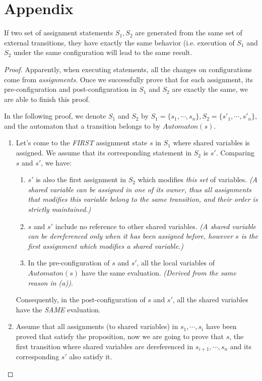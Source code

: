 \section*{Appendix}

\setcounter{theorem}{0}
\begin{theorem} If two set of assignment statements $S_1, S_2$ are generated from the same set of external transitions, they have exactly the same behavior (i.e. execution of $S_1$ and $S_2$ under the same configuration will lead to the same result.
\end{theorem}
\begin{proof}
    Apparently, when executing statements, all the changes on configurations come from \emph{assignments}. Once we successfully prove that for each assignment, its pre-configuration and post-configuration in $S_1$ and $S_2$ are exactly the same, we are able to finish this proof.
    
    In the following proof, we denote $S_1$ and $S_2$ by $S_1=\{s_1,\cdots,s_n\},S_2=\{s'_1,\cdots,s'_n\}$, and the automaton that a transition belongs to by $Automaton(s)$.
    \begin{enumerate}
        \item Let's come to the \emph{FIRST} assignment state $s$ in $S_1$ where shared variables is assigned. We assume that its corresponding statement in $S_2$ is $s'$. Comparing $s$ and $s'$, we have:
        \begin{enumerate}
            \item $s'$ is also the first assignment in $S_2$ which modifies \emph{this set} of variables.
            \emph{(A shared variable can be assigned in one of its owner, thus all assignments that modifies this variable belong to the same transition, and their order is strictly maintained.)}
            \item $s$ and $s'$ include no reference to other shared variables. \emph{(A shared variable can be dereferenced only when it has been assigned before, however $s$ is the first assignment which modifies a shared variable.)}
            \item In the pre-configuration of $s$ and $s'$, all the local variables of $Automaton(s)$ have the same evaluation. \emph{(Derived from the same reason in (a))}.
        \end{enumerate}
        Consequently, in the post-configuration of $s$ and $s'$, all the shared variables have the \emph{SAME} evaluation.

        \item Assume that all assignments (to shared variables) in $s_1,\cdots,s_i$ have been proved that satisfy the proposition, now we are going to prove that $s$, the first transition where shared variables are dereferenced in $s_{i+1},\cdots,s_n$ and its corresponding $s'$ also satisfy it.
    \end{enumerate}
\end{proof}
